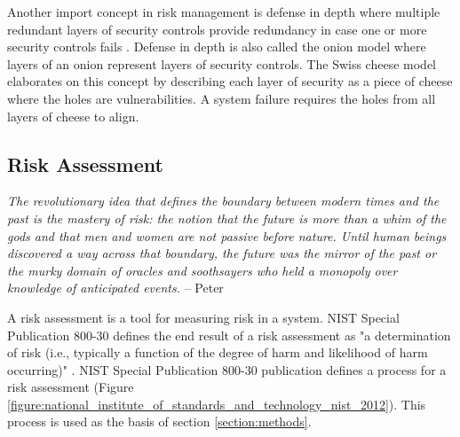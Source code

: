 \documentclass{article}
\begin{document}
Another import concept in risk management is \gls{defense in depth} where multiple redundant layers of security controls provide redundancy in case one or more security controls fails \citep{gordon_official_2015-1}. Defense in depth is also called the onion model where layers of an onion represent layers of security controls. The Swiss cheese model elaborates on this concept by describing each layer of security as a piece of cheese where the holes are vulnerabilities. A system failure requires the holes from all layers of cheese to align.

\subsection{Risk Assessment} \label{section:risk_assessment}

\begin{mdframed}
\emph{The revolutionary idea that defines the boundary between modern times and the past is the mastery of risk: the notion that the future is more than a whim of the gods and that men and women are not passive before nature. Until human beings discovered a way across that boundary, the future was the mirror of the past or the murky domain of oracles and soothsayers who held a monopoly over knowledge of anticipated events.} -- Peter \cite{bernstein_against_1998}
\end{mdframed}

\noindent A risk assessment is a tool for measuring risk in a system. NIST Special Publication 800-30 defines the end result of a risk assessment as "a determination of risk (i.e., typically a function of the degree of harm and likelihood of harm occurring)" \citep[page 1]{national_institute_of_standards_and_technology_nist_2012}. NIST Special Publication 800-30 publication defines a process for a risk assessment (Figure \ref{figure:national_institute_of_standards_and_technology_nist_2012}). This process is used as the basis of section \ref{section:methods}.
\end{document}
